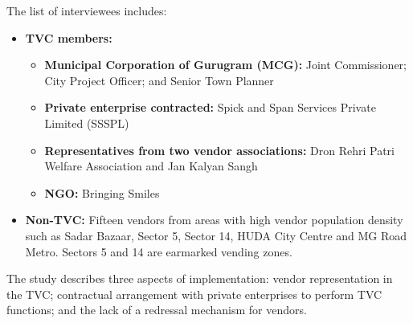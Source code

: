 \documentclass[a4paper, 12pt, twoside]{article}
\begin{document}
{The list of interviewees includes:

\begin{itemize}
\item \textbf{TVC members:}
	\begin{itemize}
	\item \textbf{Municipal Corporation of Gurugram (MCG):} Joint Commissioner; City Project Officer; and Senior Town Planner
	\item \textbf{Private enterprise contracted:} Spick and Span Services Private Limited (SSSPL)
	\item \textbf{Representatives from two vendor associations:} Dron Rehri Patri Welfare Association and Jan Kalyan Sangh
	\item \textbf{NGO:} Bringing Smiles
	\end{itemize}
\item \textbf{Non-TVC:} Fifteen vendors from areas with high vendor population density such as Sadar Bazaar, Sector 5, Sector 14, HUDA City Centre and MG Road Metro. Sectors 5 and 14 are earmarked vending zones.
\end{itemize}

The study describes three aspects of implementation: vendor representation in the TVC; contractual arrangement with private enterprises to perform TVC functions; and the lack of a redressal mechanism for vendors.

}
\end{document}
